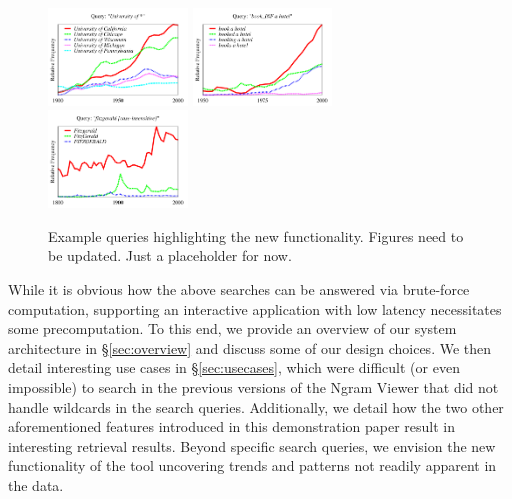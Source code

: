 \documentclass[11pt]{article}
\begin{document}
\begin{figure}
\centering
\hspace*{-0.5cm}
\includegraphics[width=0.33\textwidth]{graphs/university}
\hspace*{0.1cm}
\includegraphics[width=0.33\textwidth]{graphs/book}
\hspace*{0.1cm}
\includegraphics[width=0.33\textwidth]{graphs/fitzgerald}
\hspace*{-0.5cm}
\vspace*{-0.25cm}\caption{\label{fig:examples}
Example queries highlighting the new functionality. Figures need to be updated. Just a placeholder for now.}
\end{figure}

While it is obvious how the above searches can be answered via brute-force computation, supporting an interactive application with low latency necessitates some precomputation. To this end, we provide an overview of our system architecture in \S\ref{sec:overview} and discuss some of our design choices. We then detail interesting use cases in \S\ref{sec:usecases}, which were difficult (or even impossible) to search in the previous versions of the Ngram Viewer that did not handle wildcards in the search queries. Additionally, we detail how the two other aforementioned features introduced in this demonstration paper result in interesting retrieval results. Beyond specific search queries, we envision the new functionality of the tool uncovering trends and patterns not readily apparent in the data.
\end{document}
